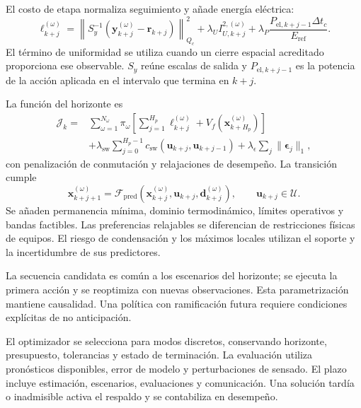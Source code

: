 El costo de etapa normaliza seguimiento y añade energía eléctrica:
\begin{equation}
\ell_{k+j}^{(\omega)}=
\left\|S_y^{-1}(\mathbf y_{k+j}^{(\omega)}-\mathbf r_{k+j})\right\|_{Q_c}^2
+\lambda_UI_{U,k+j}^{2,(\omega)}
+\lambda_P\frac{P_{\mathrm{el},k+j-1}\Delta t_c}{E_{\mathrm{ref}}}.
\label{met:costo_etapa}
\end{equation}
El término de uniformidad se utiliza cuando un cierre espacial acreditado proporciona ese observable. $S_y$ reúne escalas de salida y $P_{\mathrm{el},k+j-1}$ es la potencia de la acción aplicada en el intervalo que termina en $k+j$.

La función del horizonte es
\begin{equation}
\begin{split}
\mathcal J_k={}&\sum_{\omega=1}^{N_\omega}\pi_\omega
\left[\sum_{j=1}^{H_p}\ell_{k+j}^{(\omega)}+V_f(\mathbf x_{k+H_p}^{(\omega)})\right]\\
&+\lambda_{\mathrm{sw}}\sum_{j=0}^{H_p-1}c_{\mathrm{sw}}(\mathbf u_{k+j},\mathbf u_{k+j-1})
+\lambda_\epsilon\sum_j\|\boldsymbol\epsilon_j\|_1,
\end{split}
\label{met:costo_mpc}
\end{equation}
con penalización de conmutación y relajaciones de desempeño. La transición cumple
\begin{equation}
\mathbf x_{k+j+1}^{(\omega)}=\mathcal F_{\mathrm{pred}}
(\mathbf x_{k+j}^{(\omega)},\mathbf u_{k+j},\mathbf d_{k+j}^{(\omega)}),
\qquad \mathbf u_{k+j}\in\mathcal U.
\label{met:restricciones_mpc}
\end{equation}
Se añaden permanencia mínima, dominio termodinámico, límites operativos y bandas factibles. Las preferencias relajables se diferencian de restricciones físicas de equipos. El riesgo de condensación y los máximos locales utilizan el soporte y la incertidumbre de sus predictores.

La secuencia candidata es común a los escenarios del horizonte; se ejecuta la primera acción y se reoptimiza con nuevas observaciones. Esta parametrización mantiene causalidad. Una política con ramificación futura requiere condiciones explícitas de no anticipación.

El optimizador se selecciona para modos discretos, conservando horizonte, presupuesto, tolerancias y estado de terminación. La evaluación utiliza pronósticos disponibles, error de modelo y perturbaciones de sensado. El plazo incluye estimación, escenarios, evaluaciones y comunicación. Una solución tardía o inadmisible activa el respaldo y se contabiliza en desempeño.

